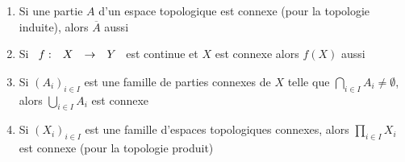 \documentclass[]{report}
\begin{document}
    \begin{prop}{}{}
        \begin{enumerate}
            \item Si une partie $A$ d'un espace topologique est connexe (pour la topologie induite), alors $\overline{A}$ aussi
            \item Si $\begin{array}{ccccc} f : & X & \to & Y \end{array}$ est continue et $X$ est connexe alors $f(X)$ aussi
            \item Si $(A_i)_{i\in I}$ est une famille de parties connexes de $X$ telle que $\bigcap_{i\in I}A_i\neq \emptyset$, alors $\bigcup_{i\in I} A_i$ est connexe
            \item Si $(X_i)_{i\in I}$ est une famille d'espaces topologiques connexes, alors $\prod_{i\in I}X_i$ est connexe (pour la topologie produit)
        \end{enumerate}
    \end{prop}
\end{document}
